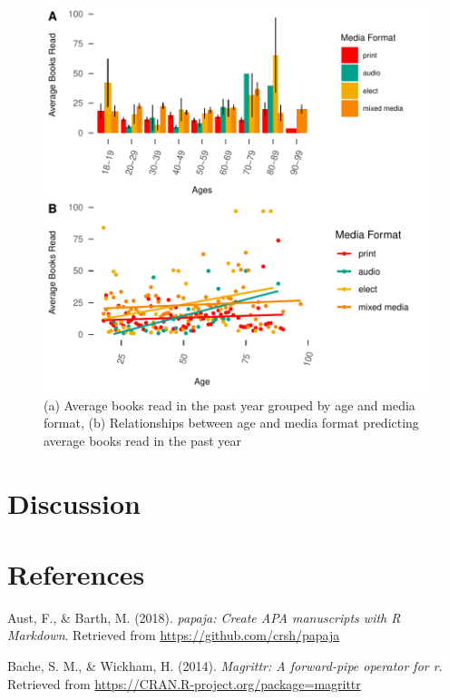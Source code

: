 \documentclass[man, fleqn, noextraspace]{apa6}
\theoremstyle{definition}
\theoremstyle{definition}
\theoremstyle{definition}
\theoremstyle{remark}
\begin{document}
\begin{figure}
\centering
\includegraphics{final_manuscript_files/figure-latex/fig4-1.pdf}
\caption{\label{fig:fig4}(a) Average books read in the past year grouped by
age and media format, (b) Relationships between age and media format
predicting average books read in the past year}
\end{figure}

\section{Discussion}\label{discussion}

\newpage

\section{References}\label{references}

\begingroup
\setlength{\parindent}{-0.5in} \setlength{\leftskip}{0.5in}

\hypertarget{refs}{}
\hypertarget{ref-R-papaja}{}
Aust, F., \& Barth, M. (2018). \emph{papaja: Create APA manuscripts with
R Markdown}. Retrieved from \url{https://github.com/crsh/papaja}

\hypertarget{ref-R-magrittr}{}
Bache, S. M., \& Wickham, H. (2014). \emph{Magrittr: A forward-pipe
operator for r}. Retrieved from
\url{https://CRAN.R-project.org/package=magrittr}
\end{document}
